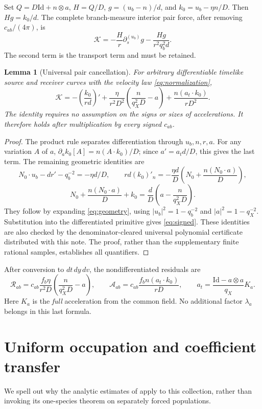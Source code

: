 \documentclass[11pt]{article}
\newcommand{\Id}{\mathrm{Id}}
\newtheorem{lemma}[theorem]{Lemma}
\theoremstyle{remark}\newtheorem{remark}[theorem]{Remark}
\numberwithin{equation}{section}
\begin{document}
Set $Q=D\Id+n\otimes a$, $H=Q/D$, $g=(u_b-n)/d$, and
$k_0=u_b-\eta n/D$. Then $Hg=k_0/d$. The complete branch-measure
interior pair force, after removing $c_{ab}/(4\pi)$, is
\[
 \mathcal K=-\frac Hr\partial_s^{(u_b)}g-\frac{Hg}{r^2q_b^2d}.
\]
The second term is the transport term and must be retained.

\begin{lemma}[Universal pair cancellation]\label{lem:cancellation}
For arbitrary differentiable timelike source and receiver curves with
the velocity law \eqref{eq:normalization},
\begin{equation}\label{eq:signed}
 \mathcal K=-\left(\frac{k_0}{rd}\right)'
  +\frac{\eta}{r^2D^2}\left(\frac{n}{q_X^2D}-a\right)
  +\frac{n(a_t\cdot k_0)}{rD^2}.
\end{equation}
The identity requires no assumption on the signs or sizes of accelerations.
It therefore holds after multiplication by every signed $c_{ab}$.
\end{lemma}
\begin{proof}
The product rule separates differentiation through $u_b,n,r,a$.
For any variation $A$ of $a$,
$\partial_a k_0[A]=n(A\cdot k_0)/D$; since $a'=a_t d/D$, this gives
the last term. The remaining geometric identities are
\[
 N_0\cdot u_b-dr'-q_b^{-2}=-\eta d/D,
 \qquad rd(k_0)'_n=-\frac{\eta d}{D}
       \left(N_0+\frac{n(N_0\cdot a)}D\right),
\]
\[
 N_0+\frac{n(N_0\cdot a)}D+k_0=
       \frac dD\left(a-\frac{n}{q_X^2D}\right).
\]
They follow by expanding \eqref{eq:geometry}, using
$|u_b|^2=1-q_b^{-2}$ and $|a|^2=1-q_X^{-2}$.
Substitution into the differentiated primitive gives \eqref{eq:signed}.
These identities are also checked by the denominator-cleared universal
polynomial certificate distributed with this note. The proof, rather than
the supplementary finite rational samples, establishes all quantifiers.
\end{proof}

After conversion to $dt\,dy\,dv$, the nondifferentiated residuals are
\begin{equation}\label{eq:residuals}
 \mathcal R_{ab}=c_{ab}\frac{f_b\eta}{r^2D}
       \left(\frac{n}{q_X^2D}-a\right),\qquad
 \mathcal A_{ab}=c_{ab}\frac{f_b n(a_t\cdot k_0)}{rD},\qquad
 a_t=\frac{\Id-a\otimes a}{q_X}K_a.
\end{equation}
Here $K_a$ is the \emph{full} acceleration from the common field.
No additional factor $\lambda_a$ belongs in this last formula.

\section{Uniform occupation and coefficient transfer}
We spell out why the analytic estimates of \cite[Sections 4--8]{OAI362}
apply to this collection, rather than invoking its one-species theorem
on separately forced populations.
\end{document}
